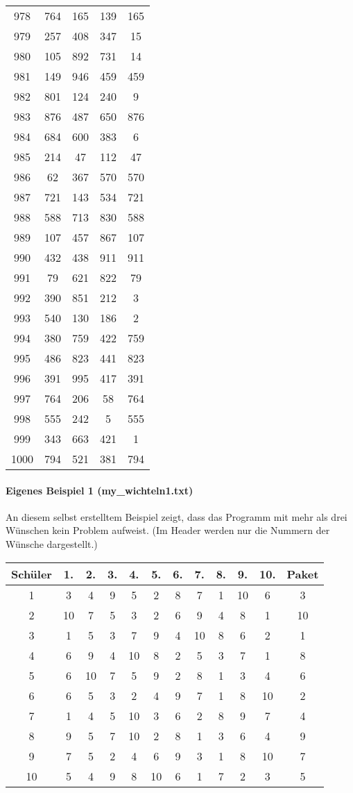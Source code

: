 \documentclass[a4paper,10pt,ngerman]{scrartcl}
\begin{document}
\begin{longtable}[c]{c|c|c|c|c}
    978 & 764 & 165 & 139 & 165 \\
    979 & 257 & 408 & 347 & 15 \\
    980 & 105 & 892 & 731 & 14 \\
    981 & 149 & 946 & 459 & 459 \\
    982 & 801 & 124 & 240 & 9 \\
    983 & 876 & 487 & 650 & 876 \\
    984 & 684 & 600 & 383 & 6 \\
    985 & 214 & 47 & 112 & 47 \\
    986 & 62 & 367 & 570 & 570 \\
    987 & 721 & 143 & 534 & 721 \\
    988 & 588 & 713 & 830 & 588 \\
    989 & 107 & 457 & 867 & 107 \\
    990 & 432 & 438 & 911 & 911 \\
    991 & 79 & 621 & 822 & 79 \\
    992 & 390 & 851 & 212 & 3 \\
    993 & 540 & 130 & 186 & 2 \\
    994 & 380 & 759 & 422 & 759 \\
    995 & 486 & 823 & 441 & 823 \\
    996 & 391 & 995 & 417 & 391 \\
    997 & 764 & 206 & 58 & 764 \\
    998 & 555 & 242 & 5 & 555 \\
    999 & 343 & 663 & 421 & 1 \\
    1000 & 794 & 521 & 381 & 794
\end{longtable}

\paragraph{Eigenes Beispiel 1 (my\_wichteln1.txt)}
An diesem selbst erstelltem Beispiel zeigt, dass das Programm mit mehr als drei Wünschen kein Problem aufweist.
(Im Header werden nur die Nummern der Wünsche dargestellt.)
\begin{longtable}[c]{c|c|c|c|c|c|c|c|c|c|c|c}
    Schüler & 1. & 2. & 3. & 4. & 5. & 6. & 7. & 8. & 9. & 10. & Paket \\
    \hline
    \endhead
    1 & 3 & 4 & 9 & 5 & 2 & 8 & 7 & 1 & 10 & 6 & 3 \\
    2 & 10 & 7 & 5 & 3 & 2 & 6 & 9 & 4 & 8 & 1 & 10 \\
    3 & 1 & 5 & 3 & 7 & 9 & 4 & 10 & 8 & 6 & 2 & 1 \\
    4 & 6 & 9 & 4 & 10 & 8 & 2 & 5 & 3 & 7 & 1 & 8 \\
    5 & 6 & 10 & 7 & 5 & 9 & 2 & 8 & 1 & 3 & 4 & 6 \\
    6 & 6 & 5 & 3 & 2 & 4 & 9 & 7 & 1 & 8 & 10 & 2 \\
    7 & 1 & 4 & 5 & 10 & 3 & 6 & 2 & 8 & 9 & 7 & 4 \\
    8 & 9 & 5 & 7 & 10 & 2 & 8 & 1 & 3 & 6 & 4 & 9 \\
    9 & 7 & 5 & 2 & 4 & 6 & 9 & 3 & 1 & 8 & 10 & 7 \\
    10 & 5 & 4 & 9 & 8 & 10 & 6 & 1 & 7 & 2 & 3 & 5
\end{longtable}
\end{document}
